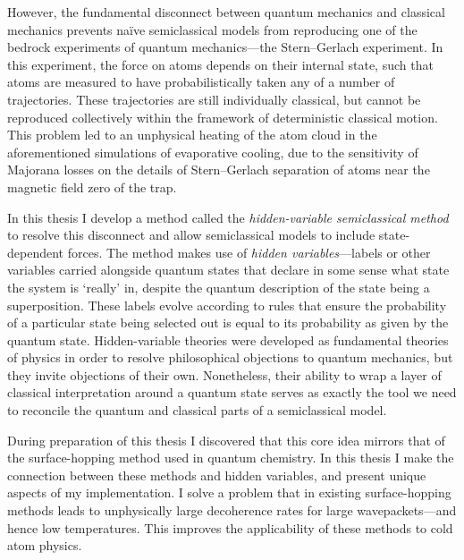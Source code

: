 However, the fundamental disconnect between quantum mechanics and classical mechanics prevents na\"ive semiclassical models from reproducing one of the bedrock experiments of quantum mechanics---the Stern--Gerlach experiment. In this experiment, the force on atoms depends on their internal state, such that atoms are measured to have probabilistically taken any of a number of trajectories. These trajectories are still individually classical, but cannot be reproduced collectively within the framework of deterministic classical motion. This problem led to an unphysical heating of the atom cloud in the aforementioned simulations of evaporative cooling, due to the sensitivity of Majorana losses on the details of Stern--Gerlach separation of atoms near the magnetic field zero of the trap.

In this thesis I develop a method called the \emph{hidden-variable semiclassical method} to resolve this disconnect and allow semiclassical models to include state-dependent forces. The method makes use of \emph{hidden variables}---labels or other variables carried alongside quantum states that declare in some sense what state the system is `really' in, despite the quantum description of the state being a superposition. These labels evolve according to rules that ensure the probability of a particular state being selected out is equal to its probability as given by the quantum state. Hidden-variable theories were developed as fundamental theories of physics in order to resolve philosophical objections to quantum mechanics, but they invite objections of their own. Nonetheless, their ability to wrap a layer of classical interpretation around a quantum state serves as exactly the tool we need to reconcile the quantum and classical parts of a semiclassical model.

During preparation of this thesis I discovered that this core idea mirrors that of the surface-hopping method used in quantum chemistry. In this thesis I make the connection between these methods and hidden variables, and present unique aspects of my implementation. I solve a problem that in existing surface-hopping methods leads to unphysically large decoherence rates for large wavepackets---and hence low temperatures. This improves the applicability of these methods to cold atom physics.

